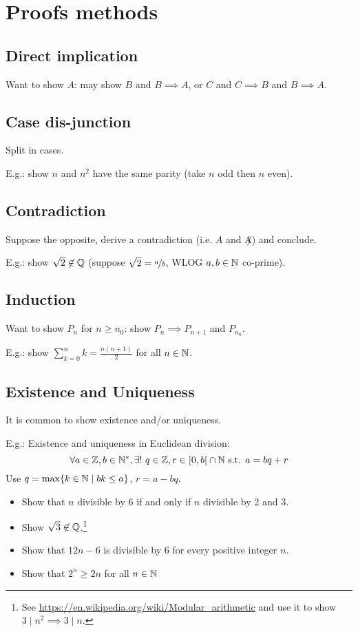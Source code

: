 \chapter{Proofs methods}

\section{Direct implication}
Want to show $A$: may show $B$ and $B \implies A$, or $C$ and $C \implies B$ and $B \implies A$.

\section{Case dis-junction}
Split in cases.

E.g.: show $n$ and $n^2$ have the same parity (take $n$ odd then $n$ even).

\section{Contradiction}
Suppose the opposite, derive a contradiction (i.e. $A$ and $\not A$) and conclude.

E.g.: show $\sqrt{2} \not\in \mathbb{Q}$ (suppose $\sqrt{2}=\nicefrac{a}{b}$, WLOG $a,b \in \mathbb{N}$ co-prime).

\section{Induction}
Want to show $P_n$ for $n \geq n_0$: show $P_n \implies P_{n+1}$ and $P_{n_0}$.

E.g.: show $\sum_{k=0}^{n} k = \frac{n(n+1)}{2}$ for all $n \in \mathbb{N}$.

\section{Existence and Uniqueness}
It is common to show existence and/or uniqueness.

E.g.: Existence and uniqueness in Euclidean division: 
$$\forall a \in \mathbb{Z}, b \in \mathbb{N}^*, \exists ! \ q \in \mathbb{Z}, r \in \left[ 0, b \right[ \cap \mathbb{N} \text{ s.t. } a=bq+r$$
Use $q = \max\{ k \in \mathbb{N} \mid bk \leq a \}$, $r = a-bq$.

\begin{question}
	\begin{itemize}
		\item Show that $n$ divisible by 6 if and only if $n$ divisible by 2 and 3.
		\item Show $\sqrt{3} \not\in \mathbb{Q}$.\footnote{See \url{https://en.wikipedia.org/wiki/Modular_arithmetic} and use it to show $3 \mid n^2 \implies 3 \mid n$.}
		\item Show that $12n-6$ is divisible by 6 for every positive integer $n$.
		\item Show that $2^n \geq 2n$ for all $n \in \mathbb{N}$
	\end{itemize}
\end{question}